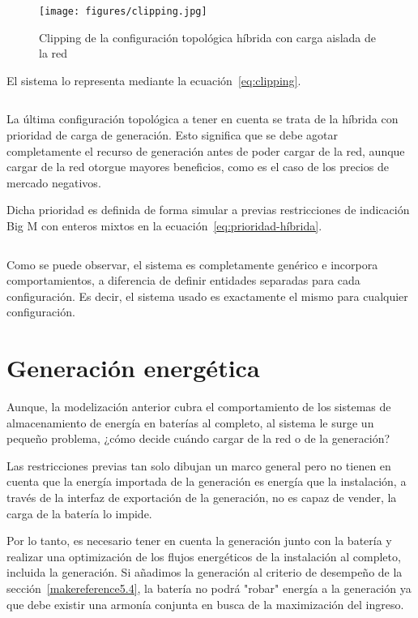 \begin{figure}
  \centering
  \texttt{[image: figures/clipping.jpg]}
  \caption{Clipping de la configuración topológica híbrida con carga aislada de la red}
  \label{fig:clipping}
\end{figure}

El sistema lo representa mediante la ecuación~\ref{eq:clipping}.

\begin{equation}
  \label{eq:clipping}
\end{equation}

La última configuración topológica a tener en cuenta se trata de la híbrida con prioridad de carga de generación. Esto significa que se debe agotar completamente el recurso de generación antes de poder cargar de la red, aunque cargar de la red otorgue mayores beneficios, como es el caso de los precios de mercado negativos.

Dicha prioridad es definida de forma simular a previas restricciones de indicación Big M con enteros mixtos en la ecuación~\ref{eq:prioridad-híbrida}.

\begin{equation}
  \label{eq:prioridad-híbrida}
\end{equation}

Como se puede observar, el sistema es completamente genérico e incorpora comportamientos, a diferencia de definir entidades separadas para cada configuración. Es decir, el sistema usado es exactamente el mismo para cualquier configuración.

\section{Generación energética}
\label{makereference5.3}

Aunque, la modelización anterior cubra el comportamiento de los sistemas de almacenamiento de energía en baterías al completo, al sistema le surge un pequeño problema, ¿cómo decide cuándo cargar de la red o de la generación?

Las restricciones previas tan solo dibujan un marco general pero no tienen en cuenta que la energía importada de la generación es energía que la instalación, a través de la interfaz de exportación de la generación, no es capaz de vender, la carga de la batería lo impide.

Por lo tanto, es necesario tener en cuenta la generación junto con la batería y realizar una optimización de los flujos energéticos de la instalación al completo, incluida la generación. Si añadimos la generación al criterio de desempeño de la sección~\ref{makereference5.4}, la batería no podrá "robar" energía a la generación ya que debe existir una armonía conjunta en busca de la maximización del ingreso.

